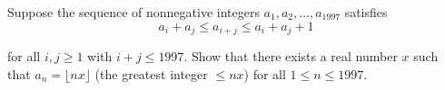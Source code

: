 Suppose the sequence of nonnegative integers $a_1, a_2, \ldots, a_{1997}$ satisfies\[ a_i + a_j \leq a_{i+j} \leq a_i + a_j + 1  \]

for all $i,j \geq 1$ with $i + j \leq 1997$.  Show that there exists a real number $x$ such that $a_n = \lfloor nx \rfloor$ (the greatest integer $\leq nx$) for all $1 \leq n \leq 1997$.
